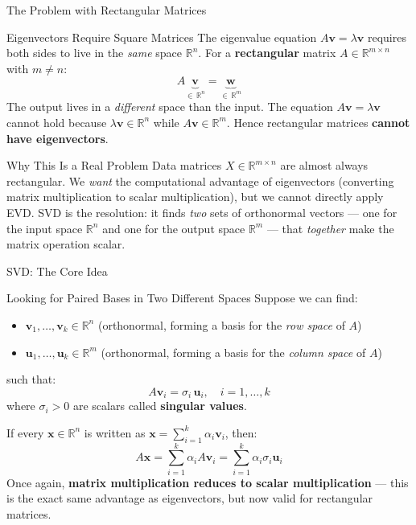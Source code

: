 \documentclass{beamer}
\begin{document}
\begin{frame}[shrink=10]{The Problem with Rectangular Matrices}
  \begin{block}{Eigenvectors Require Square Matrices}
    The eigenvalue equation $A\mathbf{v} = \lambda\mathbf{v}$ requires
    both sides to live in the \emph{same} space $\mathbb{R}^n$.
    For a \textbf{rectangular} matrix $A \in \mathbb{R}^{m \times n}$
    with $m \neq n$:
    \[
      A\underbrace{\mathbf{v}}_{\in\,\mathbb{R}^n}
        = \underbrace{\mathbf{w}}_{\in\,\mathbb{R}^m}
    \]
    The output lives in a \emph{different} space than the input.
    The equation $A\mathbf{v} = \lambda\mathbf{v}$ cannot hold because
    $\lambda\mathbf{v} \in \mathbb{R}^n$ while $A\mathbf{v} \in \mathbb{R}^m$.
    Hence rectangular matrices \textbf{cannot have eigenvectors}.
  \end{block}

  \begin{block}{Why This Is a Real Problem}
    Data matrices $X \in \mathbb{R}^{m \times n}$ are almost always
    rectangular.
    We \emph{want} the computational advantage of eigenvectors
    (converting matrix multiplication to scalar multiplication), but
    we cannot directly apply EVD.
    SVD is the resolution: it finds \emph{two} sets of orthonormal
    vectors --- one for the input space $\mathbb{R}^n$ and one for the
    output space $\mathbb{R}^m$ --- that \emph{together} make the
    matrix operation scalar.
  \end{block}
\end{frame}

\begin{frame}[shrink=10]{SVD: The Core Idea}
  \begin{block}{Looking for Paired Bases in Two Different Spaces}
    Suppose we can find:
    \begin{itemize}\setlength\itemsep{4pt}
      \item $\mathbf{v}_1,\ldots,\mathbf{v}_k \in \mathbb{R}^n$
            (orthonormal, forming a basis for the \emph{row space} of $A$)
      \item $\mathbf{u}_1,\ldots,\mathbf{u}_k \in \mathbb{R}^m$
            (orthonormal, forming a basis for the \emph{column space} of $A$)
    \end{itemize}
    such that:
    \[
      A\mathbf{v}_i = \sigma_i\,\mathbf{u}_i,
      \quad i = 1,\ldots,k
    \]
    where $\sigma_i > 0$ are scalars called \textbf{singular values}.

    \medskip

    If every $\mathbf{x} \in \mathbb{R}^n$ is written as
    $\mathbf{x} = \sum_{i=1}^k \alpha_i\mathbf{v}_i$, then:
    \[
      A\mathbf{x}
        = \sum_{i=1}^k \alpha_i A\mathbf{v}_i
        = \sum_{i=1}^k \alpha_i\sigma_i\mathbf{u}_i
    \]
    Once again, \textbf{matrix multiplication reduces to scalar
    multiplication} --- this is the exact same advantage as eigenvectors,
    but now valid for rectangular matrices.
  \end{block}
\end{frame}
\end{document}
